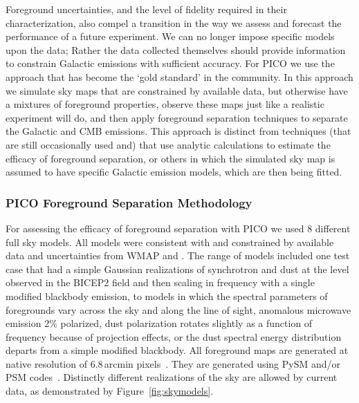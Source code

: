 \documentclass[PICOReport.tex]{subfiles}
\begin{document}
Foreground uncertainties, and the level of fidelity required in their characterization, also compel a transition in the way we assess and forecast the performance of a future experiment. We can no longer impose specific models upon the data;  Rather the data collected themselves should provide information to constrain Galactic emissions with sufficient accuracy. For PICO we use the approach that has become the `gold standard' in the community. In this approach we simulate sky maps that are constrained by available data, but otherwise have a mixtures of foreground properties, observe these maps just like a realistic experiment will do, and then apply foreground separation techniques to separate the Galactic and CMB emissions. This approach is distinct from techniques (that are still occasionally used and) that use analytic calculations to estimate the efficacy of foreground separation, or others in which the simulated sky map is assumed to have specific Galactic emission models, which are then being fitted. 


\subsubsection{PICO Foreground Separation Methodology}

 \hspace{0.1in} For assessing the efficacy of foreground separation with PICO we used 8 different full sky models. All models were consistent with and constrained by available data and uncertainties from WMAP and \planck . The range of models included one test case that had a simple Gaussian realizations of synchrotron and dust at the level observed in the BICEP2 field and then scaling in frequency with a single modified blackbody emission, to models in which the spectral parameters of foregrounds vary across the sky and along the line of sight, anomalous microwave emission  2\% polarized, dust polarization rotates slightly as a function of frequency because of projection effects, or the dust spectral energy distribution departs from a simple modified blackbody. All foreground maps are generated at native resolution of 6.8\,arcmin pixels~\citep{healpix}. They are generated using PySM and/or PSM codes~\citep{??}.   Distinctly different realizations of the sky are allowed by current data, as demonstrated by Figure~\ref{fig:skymodels}. 
\end{document}
